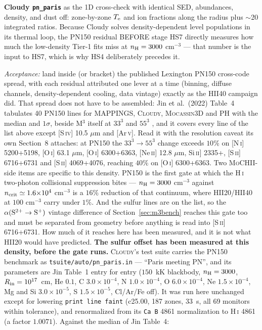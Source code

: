 \documentclass[english,a4paper]{my_memo}
\newcommand{\code}[1]{\texttt{#1}}
\newcommand{\MoCHII}{\textsc{MoCHII}}
\newcommand{\Mthree}{M$^3$}
\newcommand{\Mocassin}{\textsc{Mocassin}}
\newcommand{\Cloudy}{\textsc{Cloudy}}
\newcommand{\Te}{T_{\rm e}}
\begin{document}
\textbf{Cloudy \code{pn\_paris}} as the 1D cross-check with identical
SED, abundances, density, and dust off: zone-by-zone $\Te$ and ion
fractions along the radius plus $\sim$20 integrated ratios.  Because
Cloudy solves density-dependent level populations in its thermal loop,
the PN150 residual BEFORE stage HS7 directly measures how much the
low-density Tier-1 fits miss at $n_{\rm H}=3000$ cm$^{-3}$ --- that
number is the input to HS7, which is why HS4 deliberately precedes it.

\emph{Acceptance:} land inside (or bracket) the published Lexington
PN150 cross-code spread, with each residual attributed one lever at a
time (binning, diffuse channels, density-dependent cooling, data
vintage) exactly as the HII40 campaign did.  That spread does not have
to be assembled: Jin et al.\ (2022) Table~4 tabulates 40 PN150 lines
for MAPPINGS, \Cloudy{}, \Mocassin{}3D and PH with the median and
$1\sigma$, beside \Mthree{} itself at $33^3$ and $55^3$
\cite{jin2022}, and it covers every line of the list above except
[S\,\textsc{iv}] 10.5 $\mu$m and [Ar\,\textsc{v}].  Read it with the
resolution caveat its own Section~8 attaches: at PN150 the
$33^3\rightarrow55^3$ change exceeds $10\%$ on
[N\,\textsc{i}] 5200+5198, [O\,\textsc{i}] 63.1 $\mu$m,
[O\,\textsc{i}] 6300+6363, [Ne\,\textsc{ii}] 12.8 $\mu$m,
Si\,\textsc{ii}] 2335+, [S\,\textsc{ii}] 6716+6731 and
[S\,\textsc{ii}] 4069+4076, reaching $40\%$ on [O\,\textsc{i}]
6300+6363.  Two \MoCHII{}-side items are specific to this density.
PN150 is the first gate at which the H\,\textsc{i} two-photon
collisional suppression bites --- $n_{\rm H} = 3000$ cm$^{-3}$ against
$n_{\rm crit} \simeq 1.6{\times}10^4$ cm$^{-3}$ is a $16\%$ reduction
of that continuum, where HII20/HII40 at $100$ cm$^{-3}$ carry under
$1\%$.  And the sulfur lines are on the list, so the
$\alpha({\rm S^{2+}}\rightarrow{\rm S^+})$ vintage difference of
Section~\ref{sec:m3bench} reaches this gate too and must be separated from
geometry before anything is read into [S\,\textsc{ii}] 6716+6731.  How
much of it reaches here has been measured, and it is not what HII20 would
have predicted.
\textbf{The sulfur offset has been measured at this density, before the gate
runs.}  \Cloudy{}'s test suite carries the PN150 benchmark as
\code{tsuite/auto/pn\_paris.in} --- ``Paris meeting PN'', and its
parameters are Jin Table~1 entry for entry ($150$~kK blackbody,
$n_{\rm H} = 3000$, $R_{\rm in} = 10^{17}$~cm, He $0.1$,
C $3.0{\times}10^{-4}$, N $1.0{\times}10^{-4}$, O $6.0{\times}10^{-4}$,
Ne $1.5{\times}10^{-4}$, Mg and Si $3.0{\times}10^{-5}$,
S $1.5{\times}10^{-5}$, Cl/Ar/Fe off).  It was run here unchanged except
for lowering \code{print line faint} (c25.00, 187 zones, 33~s, all 69
monitors within tolerance), and renormalized from its \code{Ca B} 4861
normalization to H\,\textsc{i} 4861 (a factor $1.0071$).  Against the
median of Jin Table~4:
\end{document}
